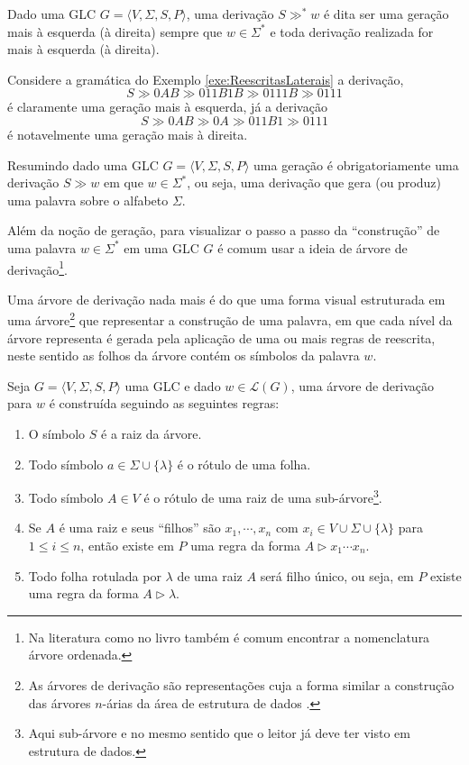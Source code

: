 \begin{definition}\label{def:TipoGeracao}
	Dado uma GLC $G = \langle V, \Sigma, S, P\rangle$,  uma derivação $S \gg^* w$ é dita ser uma geração mais à esquerda (à direita) sempre que $w \in \Sigma^*$ e toda derivação realizada for mais à esquerda (à direita).
\end{definition}

\begin{example}\label{exe:TipoGeracao}
	Considere a gramática do Exemplo \ref{exe:ReescritasLaterais} a derivação, 
	$$S \gg 0AB \gg 011B1B \gg 0111B \gg 0111$$
	é claramente uma geração mais à esquerda, já a derivação
	$$S \gg 0AB \gg 0A \gg 011B1 \gg 0111$$
	é notavelmente uma geração mais à direita.
\end{example}

\begin{remark}
  Resumindo dado uma GLC $G = \langle V, \Sigma, S, P\rangle$ uma geração é obrigatoriamente uma derivação $S \gg w$ em que $w \in \Sigma^*$, ou seja, uma derivação que gera (ou produz) uma palavra sobre o alfabeto $\Sigma$.
\end{remark}

Além da noção de geração, para visualizar o passo a passo da ``construção'' de uma palavra $w \in \Sigma^*$ em uma GLC $G$ é comum usar a ideia de árvore de derivação\footnote{Na literatura como no livro \cite{benjaLivro2010} também é comum encontrar a nomenclatura árvore ordenada.}. 

Uma árvore de derivação nada mais é do que uma forma visual estruturada em uma árvore\footnote{As árvores de derivação são representações cuja a forma similar a construção das árvores $n$-árias da área de estrutura de dados \cite{jaime1994}.} que representar a construção de uma palavra, em que cada nível da árvore representa é gerada pela aplicação de uma ou mais regras de reescrita, neste sentido as folhos da árvore contém os símbolos da palavra $w$.

\begin{definition}\label{def:ArvoreGLC}
	Seja $G = \langle V, \Sigma, S, P\rangle$ uma GLC e dado $w \in \mathcal{L}(G)$, uma árvore de derivação para $w$ é construída seguindo as seguintes regras:
	\begin{enumerate}
		\item O símbolo $S$ é a raiz da árvore.
		\item Todo símbolo $a \in \Sigma \cup \{\lambda\}$ é o rótulo de uma folha.
		\item Todo símbolo $A \in V$ é o rótulo de uma raiz de uma sub-árvore\footnote{Aqui sub-árvore e no mesmo sentido que o leitor já deve ter visto em estrutura de dados.}.
		\item Se $A$ é uma raiz e seus ``filhos'' são  $x_1, \cdots, x_n$ com $x_i \in V \cup \Sigma \cup \{\lambda\}$ para $1 \leq i \leq n$, então existe em $P$ uma regra da forma $A \rhd x_1\cdots x_n$.
		\item Todo folha rotulada por $\lambda$ de uma raiz $A$ será filho único, ou seja, em $P$ existe uma regra da forma $A \rhd \lambda$.
	\end{enumerate}
\end{definition}

